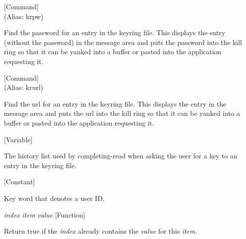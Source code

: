 \vspace{1em}
\noindent
{}
\usebox{\funcname}
 \hfill [Command]\\%
 (Alias: krpw)

\begin{doc-string}
Find the password for an entry in the keyring file.  This displays the entry
(without the password) in the message area and puts the password into the kill
ring so that it can be yanked into a buffer or pasted into the application
requesting it.
\end{doc-string}

\vspace{1em}
\noindent
{}
\usebox{\funcname}
 \hfill [Command]\\%
 (Alias: krurl)

\begin{doc-string}
Find the url for an entry in the keyring file.  This displays the entry in
the message area and puts the url into the kill ring so that it can be yanked
into a buffer or pasted into the application requesting it.
\end{doc-string}

\vspace{1em}
\noindent
{}
\usebox{\funcname}
 \hfill [Variable]

\begin{doc-string}
The history list used by completing-read when asking the user for a key to an
entry in the keyring file.
\end{doc-string}

\vspace{1em}
\noindent
{}
\usebox{\funcname}
 \hfill [Constant]

\begin{doc-string}
Key word that denotes a user ID.
\end{doc-string}

\vspace{1em}
\noindent
{}
\usebox{\funcname}\emph{index} \emph{item} \emph{value}
 \hfill [Function]

\begin{doc-string}
Return true if the \emph{index} already contains the \emph{value} for this \emph{item}.
\end{doc-string}

